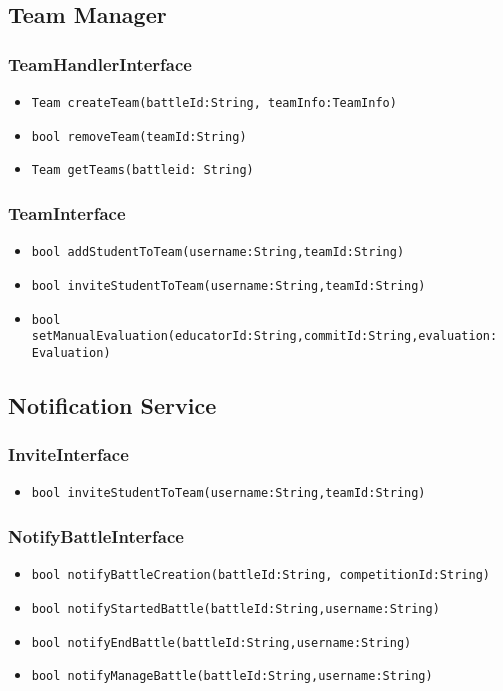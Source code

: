\subsection{Team Manager}
\subsubsection{TeamHandlerInterface}
\begin{itemize}
    \item \texttt{Team createTeam(battleId:String, teamInfo:TeamInfo)}
    \item \texttt{bool removeTeam(teamId:String)}
    \item \texttt{Team getTeams(battleid: String)}%
\end{itemize}

\subsubsection{TeamInterface}
\begin{itemize}
    \item \texttt{bool addStudentToTeam(username:String,teamId:String)}%
    \item \texttt{bool inviteStudentToTeam(username:String,teamId:String)}%
    \item \texttt{bool setManualEvaluation(educatorId:String,commitId:String,evaluation: Evaluation)}%
\end{itemize}


\subsection{Notification Service}
\subsubsection{InviteInterface}
\begin{itemize}
    \item \texttt{bool inviteStudentToTeam(username:String,teamId:String)}%
\end{itemize}

\subsubsection{NotifyBattleInterface}
\begin{itemize}
    \item \texttt{bool notifyBattleCreation(battleId:String, competitionId:String)}%
    \item \texttt{bool notifyStartedBattle(battleId:String,username:String)}
    \item \texttt{bool notifyEndBattle(battleId:String,username:String)}
    \item \texttt{bool notifyManageBattle(battleId:String,username:String)}
\end{itemize}

